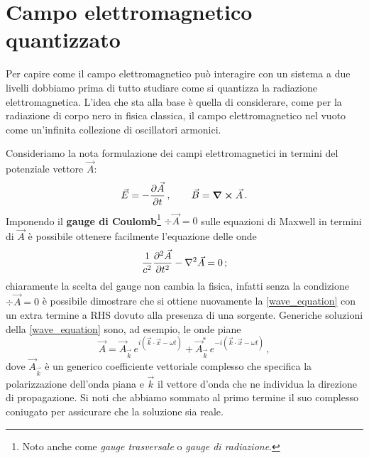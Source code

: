 \vspace{1cm}

\noindent{}

\vspace{0.5cm}

\section{Campo elettromagnetico quantizzato}\label{sec:quantized_em}
Per capire come il campo elettromagnetico può interagire con un sistema a due livelli dobbiamo prima di tutto studiare come si quantizza la radiazione elettromagnetica. L'idea che sta alla base è quella di considerare, come per la radiazione di corpo nero in fisica classica, il campo elettromagnetico nel vuoto come un'infinita collezione di oscillatori armonici. 

\noindent Consideriamo la nota formulazione dei campi elettromagnetici in termini del potenziale vettore $\vec{A}$:
\begin{equation}\label{el_magn_A}
    \vec{E} = - \pdv{\vec{A}}{t} \, , \qquad \vec{B} = \curl \vec{A} \, .
\end{equation}
Imponendo il \textbf{gauge di Coulomb}\footnote{Noto anche come \textit{gauge trasversale} o \textit{gauge di radiazione}.} $\div \vec{A} = 0$ sulle equazioni di Maxwell in termini di $\vec{A}$ è possibile ottenere facilmente l'equazione delle onde
\begin{equation}\label{wave_equation}
    \frac{1}{c^2} \pdv[2]{\vec{A}}{t} - \laplacian \vec{A} = 0 \, ;
\end{equation}
chiaramente la scelta del gauge non cambia la fisica, infatti senza la condizione $\div \vec{A} = 0$ è possibile dimostrare che si ottiene nuovamente la \eqref{wave_equation} con un extra termine a RHS dovuto alla presenza di una sorgente. Generiche soluzioni della \eqref{wave_equation} sono, ad esempio, le onde piane
\begin{equation}\label{amplitude_solution}
    \vec{A} = \vec{A}_{\vec{k}} \, e^{i \left(\vec{k} \cdot \vec{x} - \omega t\right)} + \vec{A}_{\vec{k}}^\ast \, e^{-i \left(\vec{k} \cdot \vec{x} - \omega t\right)} \, ,
\end{equation}
dove $\vec{A}_{\vec{k}}$ è un generico coefficiente vettoriale complesso che specifica la polarizzazione dell'onda piana e $\vec{k}$ il vettore d'onda che ne individua la direzione di propagazione. Si noti che abbiamo sommato al primo termine il suo complesso coniugato per assicurare che la soluzione sia reale. 

